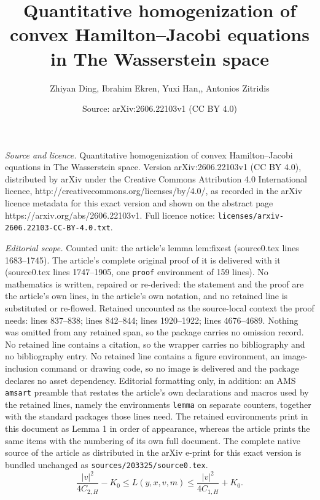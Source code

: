 \documentclass[10pt,a4paper]{amsart}
\title{Quantitative homogenization of convex Hamilton--Jacobi equations in The Wasserstein space}
\author{Zhiyan Ding, Ibrahim Ekren, Yuxi Han,, Antonios Zitridis}
\date{Source: arXiv:2606.22103v1 (CC BY 4.0)}
\begin{document}
\maketitle

\noindent\emph{Source and licence.} Quantitative homogenization of convex Hamilton--Jacobi equations in The Wasserstein space. Version arXiv:2606.22103v1 (CC BY 4.0), distributed by arXiv under the Creative Commons Attribution 4.0 International licence, http://creativecommons.org/licenses/by/4.0/, as recorded in the arXiv licence metadata for this exact version and shown on the abstract page https://arxiv.org/abs/2606.22103v1. Full licence notice: \texttt{licenses/arxiv-2606.22103-CC-BY-4.0.txt}.\par\smallskip

\noindent\textit{Editorial scope.} Counted unit: the article's lemma lem:fixest (source0.tex lines 1683--1745). The article's complete original proof of it is delivered with it (source0.tex lines 1747--1905, one \texttt{proof} environment of 159 lines). No mathematics is written, repaired or re-derived: the statement and the proof are the article's own lines, in the article's own notation, and no retained line is substituted or re-flowed.  Retained uncounted as the source-local context the proof needs: lines 837--838; lines 842--844; lines 1920--1922; lines 4676--4689.  Nothing was omitted from any retained span, so the package carries no omission record.  No retained line contains a citation, so the wrapper carries no bibliography and no bibliography entry.  No retained line contains a figure environment, an image-inclusion command or drawing code, so no image is delivered and the package declares no asset dependency.  Editorial formatting only, in addition: an AMS \texttt{amsart} preamble that restates the article's own declarations and macros used by the retained lines, namely the environments \texttt{lemma} on separate counters, together with the standard packages those lines need.  The retained environments print in this document as Lemma 1 in order of appearance, whereas the article prints the same items with the numbering of its own full document.  The complete native source of the article as distributed in the arXiv e-print for this exact version is bundled unchanged as \texttt{sources/203325/source0.tex}.
    \begin{equation}\label{eqn:Lmquad}
    \frac{|v|^2}{4C_{2,H}} -K_0 \leq L(y,x, v, m) \leq \frac{|v|^2}{4C_{1,H}} +K_0.       \end{equation}
\end{document}
